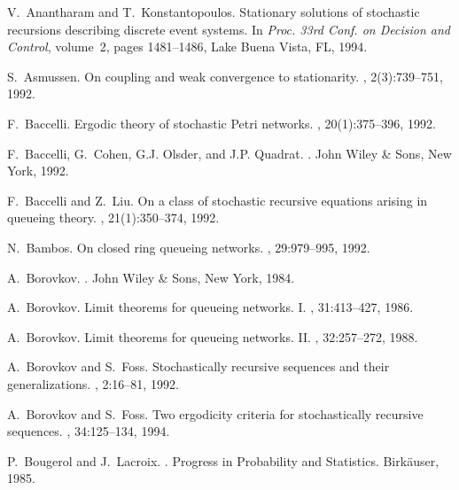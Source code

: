\documentclass[11pt,titlepage]{article}
\begin{document}
\begin{thebibliography}{10}

V.~Anantharam and T.~Konstantopoulos.
\newblock Stationary solutions of stochastic recursions describing discrete
  event systems.
\newblock In {\em Proc. 33rd Conf. on Decision and Control}, volume~2, pages
  1481--1486, Lake Buena Vista, FL, 1994.

S.~Asmussen.
\newblock On coupling and weak convergence to stationarity.
, 2(3):739--751, 1992.

F.~Baccelli.
\newblock Ergodic theory of stochastic {P}etri networks.
, 20(1):375--396, 1992.

F.~Baccelli, G.~Cohen, G.J. Olsder, and J.P. Quadrat.
.
\newblock John Wiley \& Sons, New York, 1992.

F.~Baccelli and Z.~Liu.
\newblock On a class of stochastic recursive equations arising in queueing
  theory.
, 21(1):350--374, 1992.

N.~Bambos.
\newblock On closed ring queueing networks.
, 29:979--995, 1992.

A.~Borovkov.
.
\newblock John Wiley \& Sons, New York, 1984.

A.~Borovkov.
\newblock Limit theorems for queueing networks. {I}.
, 31:413--427, 1986.

A.~Borovkov.
\newblock Limit theorems for queueing networks. {II}.
, 32:257--272, 1988.

A.~Borovkov and S.~Foss.
\newblock Stochastically recursive sequences and their generalizations.
, 2:16--81, 1992.

A.~Borovkov and S.~Foss.
\newblock Two ergodicity criteria for stochastically recursive sequences.
, 34:125--134, 1994.

P.~Bougerol and J.~Lacroix.
.
\newblock Progress in Probability and Statistics. Birk\"auser, 1985.


\end{thebibliography}
\end{document}
